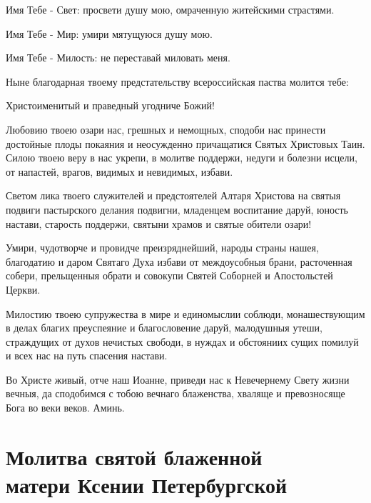 \documentclass[12pt,twoside,xdvi,a6paper,civil=times]{hipbook}
\renewcommand{\*}{\raise3pt\hbox{\footnotesize*}}
\begin{document}
Имя Тебе - Свет: просвети душу мою, омраченную житейскими страстями.

Имя Тебе - Мир: умири мятущуюся душу мою.

Имя Тебе - Милость: не переставай миловать меня.

Ныне благодарная твоему предстательству всероссийская паства молится тебе:

Христоименитый и праведный угодниче Божий!

Любовию твоею озари нас, грешных и немощных, сподоби нас принести достойные
плоды покаяния и неосужденно причащатися Святых Христовых Таин. Силою твоею
веру в нас укрепи, в молитве поддержи, недуги и болезни исцели, от напастей,
врагов, видимых и невидимых, избави.

Светом лика твоего служителей и предстоятелей Алтаря Христова на святыя
подвиги пастырского делания подвигни, младенцем воспитание даруй, юность
настави, старость поддержи, святыни храмов и святые обители озари!

Умири, чудотворче и провидче преизряднейший, народы страны нашея, благодатию и
даром Святаго Духа избави от междоусобныя брани, расточенная собери,
прельщенныя обрати и совокупи Святей Соборней и Апостольстей Церкви.

Милостию твоею супружества в мире и единомыслии соблюди, монашествующим в
делах благих преуспеяние и благословение даруй, малодушныя утеши, страждущих
от духов нечистых свободи, в нуждах и обстояниих сущих помилуй и всех нас на
путь спасения настави.

Во Христе живый, отче наш Иоанне, приведи нас к Невечернему Свету жизни
вечныя, да сподобимся с тобою вечнаго блаженства, хваляще и превозносяще Бога
во веки веков. Аминь.

\section[\civil Молитва св. блаж. Ксении Петербургской]
{Молитва святой блаженной\\матери Ксении Петербургской}
\end{document}
